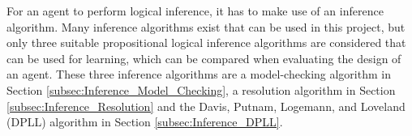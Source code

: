 For an agent to perform logical inference, it has to make use of an inference algorithm. Many inference algorithms exist that can be used in this project, but only three suitable propositional logical inference algorithms are considered that can be used for learning, which can be compared when evaluating the design of an agent. These three inference algorithms are a model-checking algorithm in Section \ref{subsec:Inference_Model_Checking}, a resolution algorithm in Section \ref{subsec:Inference_Resolution} and the Davis, Putnam, Logemann, and Loveland (DPLL) algorithm in Section \ref{subsec:Inference_DPLL}. 

